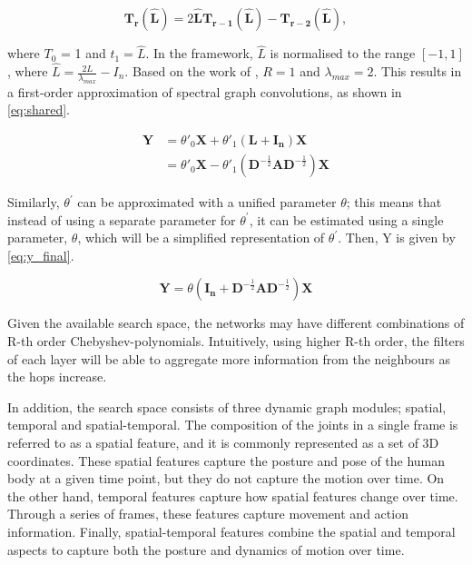 \begin{equation}
    \bm{T_r}(\bm{\hat{L}}) = 2 \bm{\hat{L}}\bm{T_{r-1}} (\bm{\hat{L}}) - \bm{T_{r-2}}(\bm{\hat{L}}),
    \label{eq:cheb}
\end{equation}

where $T_0$ = 1 and $t_1 = \hat{L}$. In the framework, $\hat{L}$ is normalised to the range $[-1,1]$, where $\hat{L} = \frac{2L}{\lambda_{max}} - I_n$. Based on the work of \autocite{DBLP:journals/corr/KipfW16}, $R = 1$ and $\lambda_{max} = 2$. This results in a first-order approximation of spectral graph convolutions, as shown in \cref{eq:shared}. 


\begin{equation}
\begin{aligned}
    \bm{Y} &= \theta'_0 \bm{X} + \theta'_1 (\bm{L} + \bm{I_n})\bm{X} \\
    &= \theta'_0 \bm{X} - \theta'_1(\bm{D}^{-\frac{1}{2}}\bm{A}\bm{D}^{-\frac{1}{2}})\bm{X}
\end{aligned}
\label{eq:shared}
\end{equation}

Similarly, $\theta^{'}$ can be approximated with a unified parameter $\theta$; this means that instead of using a separate parameter for $\theta^{'}$, it can be estimated using a single parameter, $\theta$, which will be a simplified representation of $\theta^{'}$. Then, Y is given by \cref{eq:y_final}. 

\begin{equation*}
\bm{Y} = \theta (\bm{I_n} + \bm{D}^{-\frac{1}{2}}\bm{A}\bm{D}^{-\frac{1}{2}})\bm{X}
\label{eq:y_final}
\end{equation*}

Given the available search space, the networks may have different combinations of R-th order Chebyshev-polynomials. Intuitively, using higher R-th order, the filters of each layer will be able to aggregate more information from the neighbours as the hops increase. 

In addition, the search space consists of three dynamic graph modules; spatial, temporal and spatial-temporal. The composition of the joints in a single frame is referred to as a spatial feature, and it is commonly represented as a set of 3D coordinates. These spatial features capture the posture and pose of the human body at a given time point, but they do not capture the motion over time. On the other hand, temporal features capture how spatial features change over time. Through a series of frames, these features capture movement and action information. Finally, spatial-temporal features combine the spatial and temporal aspects to capture both the posture and dynamics of motion over time.  

